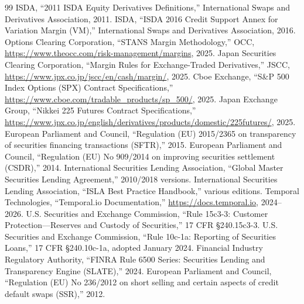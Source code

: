 \documentclass[11pt,a4paper]{article}
\begin{document}
\begin{thebibliography}{99}
 ISDA, ``2011 ISDA Equity Derivatives Definitions,'' International Swaps and Derivatives Association, 2011.
 ISDA, ``ISDA 2016 Credit Support Annex for Variation Margin (VM),'' International Swaps and Derivatives Association, 2016.
 Options Clearing Corporation, ``STANS Margin Methodology,'' OCC, \url{https://www.theocc.com/risk-management/margins}, 2025.
 Japan Securities Clearing Corporation, ``Margin Rules for Exchange-Traded Derivatives,'' JSCC, \url{https://www.jpx.co.jp/jscc/en/cash/margin/}, 2025.
 Cboe Exchange, ``S\&P 500 Index Options (SPX) Contract Specifications,'' \url{https://www.cboe.com/tradable_products/sp_500/}, 2025.
 Japan Exchange Group, ``Nikkei 225 Futures Contract Specifications,'' \url{https://www.jpx.co.jp/english/derivatives/products/domestic/225futures/}, 2025.
 European Parliament and Council, ``Regulation (EU) 2015/2365 on transparency of securities financing transactions (SFTR),'' 2015.
 European Parliament and Council, ``Regulation (EU) No 909/2014 on improving securities settlement (CSDR),'' 2014.
 International Securities Lending Association, ``Global Master Securities Lending Agreement,'' 2010/2018 versions.
 International Securities Lending Association, ``ISLA Best Practice Handbook,'' various editions.
 Temporal Technologies, ``Temporal.io Documentation,'' \url{https://docs.temporal.io}, 2024--2026.
 U.S. Securities and Exchange Commission, ``Rule 15c3-3: Customer Protection---Reserves and Custody of Securities,'' 17 CFR \S240.15c3-3.
 U.S. Securities and Exchange Commission, ``Rule 10c-1a: Reporting of Securities Loans,'' 17 CFR \S240.10c-1a, adopted January 2024.
 Financial Industry Regulatory Authority, ``FINRA Rule 6500 Series: Securities Lending and Transparency Engine (SLATE),'' 2024.
 European Parliament and Council, ``Regulation (EU) No 236/2012 on short selling and certain aspects of credit default swaps (SSR),'' 2012.
\end{thebibliography}
\end{document}
